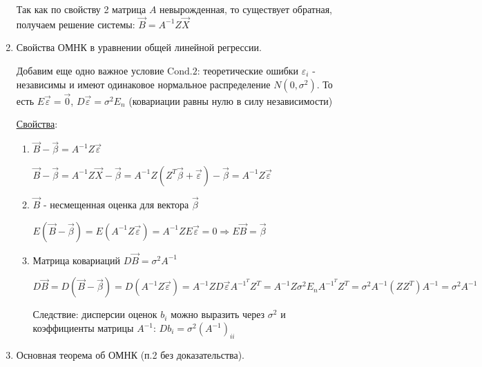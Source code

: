 \documentclass[12pt]{article}
\begin{document}
\begin{enumerate}
    Так как по свойству 2 матрица $A$ невырожденная, то существует обратная, получаем решение системы: $\vec B = A^{-1} Z \vec X$

    \item Свойства ОМНК в уравнении общей линейной регрессии.

    Добавим еще одно важное условие $\mathrm{Cond. 2}$: теоретические ошибки $\varepsilon_i$ - независимы и имеют одинаковое нормальное распределение $N(0, \sigma^2)$.
    То есть $E \vec \varepsilon = \vec 0$, $D \vec \varepsilon = \sigma^2 E_n$ (ковариации равны нулю в силу независимости)

    \underline{\hyperlink{mls_evaluation_properties}{Свойства}}:

    \begin{enumerate}
        \item $\vec B - \vec \beta = A^{-1} Z \vec \varepsilon$

        \begin{MyProof}
            $\vec B - \vec \beta = A^{-1} Z \vec X - \vec \beta = A^{-1} Z (Z^T \vec \beta + \vec \varepsilon) - \vec \beta = A^{-1} Z \vec \varepsilon$
        \end{MyProof}

        \item $\vec B$ - несмещенная оценка для вектора $\vec \beta$

        \begin{MyProof}
            $E(\vec B - \vec \beta) = E(A^{-1} Z \vec \varepsilon) = A^{-1} Z E \vec \varepsilon = 0 \Longrightarrow E \vec B = \vec \beta$
        \end{MyProof}

        \item Матрица ковариаций $D \vec B = \sigma^2 A^{-1}$

        \begin{MyProof}
            $D \vec B = D (\vec B - \vec \beta) = D (A^{-1} Z \vec \varepsilon) = A^{-1} Z D \vec \varepsilon A^{-1}^T Z^T = A^{-1} Z \sigma^2 E_n A^{-1}^T Z^T = \sigma^2 A^{-1} (Z Z^T) A^{-1} = \sigma^2 A^{-1}$
        \end{MyProof}

        Следствие: дисперсии оценок $b_i$ можно выразить через $\sigma^2$ и коэффициенты матрицы $A^{-1}$: $D b_i = \sigma^2 (A^{-1})_{ii}$

    \end{enumerate}

    \item Основная теорема об ОМНК (п.2 без доказательства).


\end{enumerate}
\end{document}
